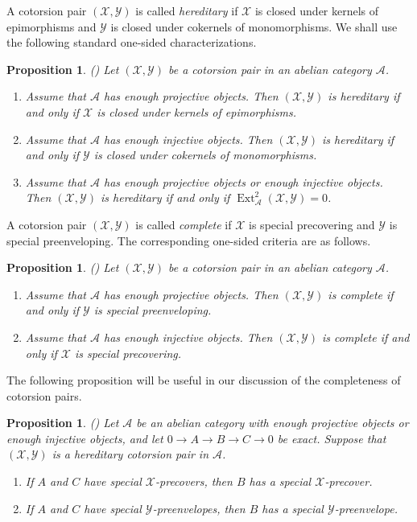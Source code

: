 \documentclass[11pt,reqno]{amsart}
\numberwithin{equation}{section}
\newtheorem{proposition}[theorem]{Proposition}
\newcommand{\cA}{\mathcal A}
\newcommand{\cX}{\mathcal X}
\newcommand{\cY}{\mathcal Y}
\newcommand{\Ext}{\operatorname{Ext}}
\begin{document}
A cotorsion pair $(\cX,\cY)$ is called \emph{hereditary} if $\cX$ is closed under kernels of epimorphisms and $\cY$ is closed under cokernels of monomorphisms. We shall use the following standard one-sided characterizations.

\begin{proposition}\label{prop:one-sided-criteria}
{\rm (\cite[Theorem~1.2.10]{GarciaRozas})}
Let $(\cX,\cY)$ be a cotorsion pair in an abelian category $\cA$.
\begin{enumerate}[label=\textup{(\arabic*)}]
\item Assume that $\cA$ has enough projective objects. Then $(\cX,\cY)$ is hereditary if and only if $\cX$ is closed under kernels of epimorphisms.
\item Assume that $\cA$ has enough injective objects. Then $(\cX,\cY)$ is hereditary if and only if $\cY$ is closed under cokernels of monomorphisms.
\item Assume that $\cA$ has enough projective objects or enough injective objects. Then $(\cX,\cY)$ is hereditary if and only if $\Ext^2_\cA(\cX,\cY)=0$.
\end{enumerate}
\end{proposition}

A cotorsion pair $(\cX,\cY)$ is called \emph{complete} if $\cX$ is special precovering and $\cY$ is special preenveloping. The corresponding one-sided criteria are as follows.

\begin{proposition}\label{prop:one-sided-complete}
{\rm (\cite[Proposition~7.1.7]{EnochsJenda})}
Let $(\cX,\cY)$ be a cotorsion pair in an abelian category $\cA$.
\begin{enumerate}[label=\textup{(\arabic*)}]
\item Assume that $\cA$ has enough projective objects. Then $(\cX,\cY)$ is complete if and only if $\cY$ is special preenveloping.
\item Assume that $\cA$ has enough injective objects. Then $(\cX,\cY)$ is complete if and only if $\cX$ is special precovering.
\end{enumerate}
\end{proposition}

The following proposition will be useful in our discussion of the completeness of cotorsion pairs.

\begin{proposition}\label{prop:extension-approx}
{\rm (\cite[Theorem~3.1]{AkinciAlizade})}
Let $\cA$ be an abelian category with enough projective objects or enough injective objects, and let
$
0\to A\to B\to C\to 0
$
be exact. Suppose that $(\cX,\cY)$ is a hereditary cotorsion pair in $\cA$.
\begin{enumerate}[label=\textup{(\arabic*)}]
\item If $A$ and $C$ have special $\cX$-precovers, then $B$ has a special $\cX$-precover.
\item If $A$ and $C$ have special $\cY$-preenvelopes, then $B$ has a special $\cY$-preenvelope.
\end{enumerate}
\end{proposition}
\end{document}
